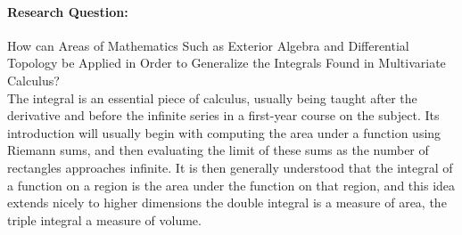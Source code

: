 \documentclass[.../main.tex]{subfiles}
\begin{document}
\paragraph*{Research Question:}
How can Areas of Mathematics Such as Exterior Algebra and Differential Topology be Applied in Order to Generalize the Integrals Found in Multivariate Calculus?\\

The integral is an essential piece of calculus, usually being taught after the derivative and before the infinite series in a first-year course on the subject. Its introduction will usually begin with computing the area under a function using Riemann sums, and then evaluating the limit of these sums as the number of rectangles approaches infinite. It is then generally understood that the integral of a function on a region is the area under the function on that region, and this idea extends nicely to higher dimensions \textemdash the double integral is a measure of area, the triple integral a measure of volume. 
\end{document}
